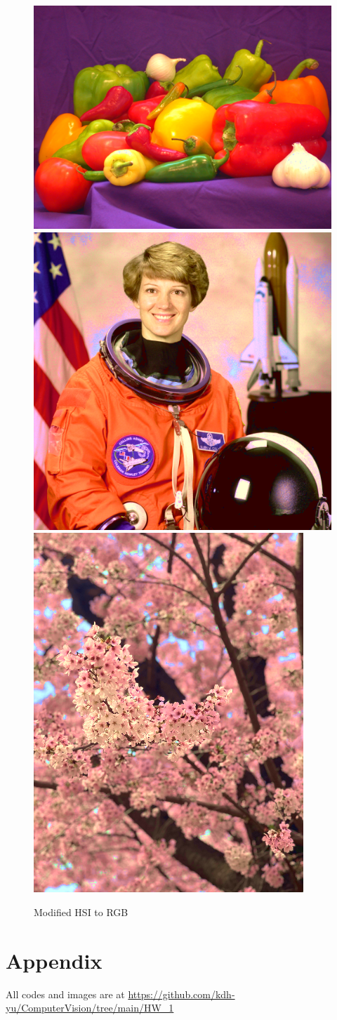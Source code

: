\documentclass{article}
\begin{document}
\begin{figure}[!ht]
    \centering
    \includegraphics[width=.356\textwidth]{fig/HSI2RGB_peppers.png}
    \includegraphics[width=.267\textwidth]{fig/HSI2RGB_astronaut.png}
    \includegraphics[width=.2\textwidth]{fig/HSI2RGB_cb.png}
    \caption{Modified HSI to RGB}
\end{figure}

\section*{Appendix}
All codes and images are at \url{https://github.com/kdh-yu/ComputerVision/tree/main/HW_1}
\end{document}
